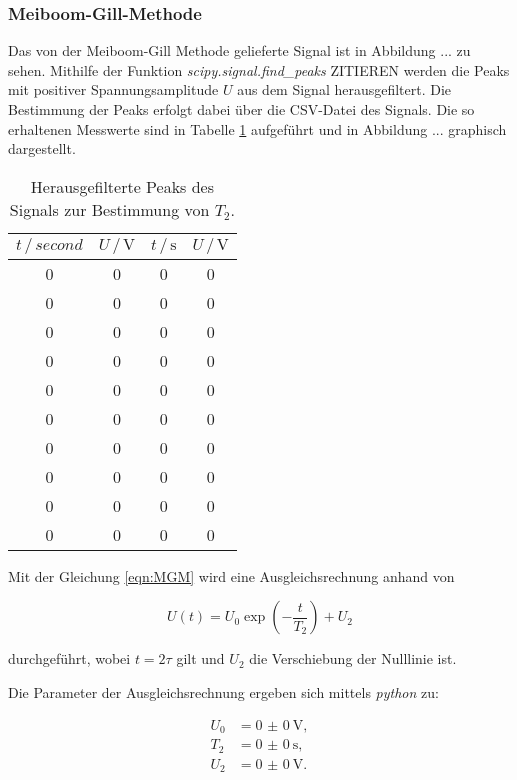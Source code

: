 \subsubsection{Meiboom-Gill-Methode}

Das von der Meiboom-Gill Methode gelieferte Signal ist in Abbildung ... zu sehen. Mithilfe der Funktion \textit{scipy.signal.find\_peaks}\cite{scipy} 
ZITIEREN werden die Peaks mit positiver Spannungsamplitude $U$ aus dem Signal herausgefiltert. Die Bestimmung der Peaks erfolgt 
dabei über die CSV-Datei des Signals. Die so erhaltenen Messwerte sind in Tabelle \ref{tab:mess2} aufgeführt und in Abbildung ... 
graphisch dargestellt. 

\begin{table}
  \centering
  \caption{Herausgefilterte Peaks des Signals zur Bestimmung von $T_2$.}
  \label{tab:mess2}
  \begin{tabular}{c c c c}
  \toprule
  $t \,/\, \si{second}$ & $U \,/\, \si{\volt}$ & $t \,/\, \si{\second}$
  & $U \,/\, \si{\volt}$\\
  \midrule 
      0 & 0 & 0 & 0\\
      0 & 0 & 0 & 0\\
      0 & 0 & 0 & 0\\
      0 & 0 & 0 & 0\\
      0 & 0 & 0 & 0\\
      0 & 0 & 0 & 0\\
      0 & 0 & 0 & 0\\
      0 & 0 & 0 & 0\\
      0 & 0 & 0 & 0\\
      0 & 0 & 0 & 0\\
  \bottomrule
  \end{tabular}
\end{table}

Mit der Gleichung \eqref{eqn:MGM} wird eine Ausgleichsrechnung anhand von 

\begin{equation*}
  U\left(t\right) = U_0 \exp{\left(-\frac{t}{T_2}\right)} + U_2
\end{equation*}

durchgeführt, wobei $t = 2\tau$ gilt und $U_2$ die Verschiebung der Nulllinie ist. 

Die Parameter der Ausgleichsrechnung ergeben sich mittels \textit{python} zu:

\begin{align}
  U_0 &= \SI{0(0)}{\volt},\\
  T_2 &= \SI{0(0)}{\second},\\
  U_2 &= \SI{0(0)}{\volt}.
\end{align}

